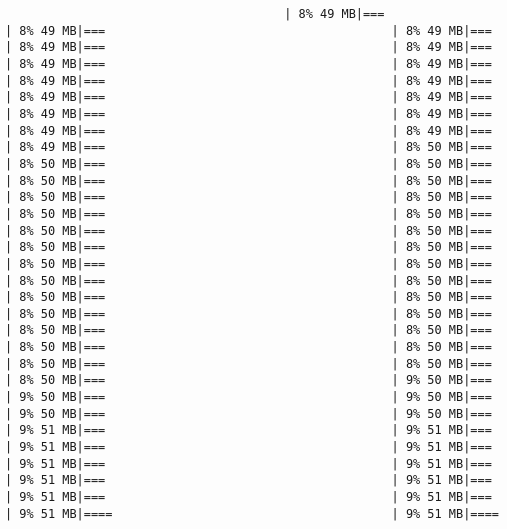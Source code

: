 \documentclass[
]{article}
\begin{document}
\begin{verbatim}
                                       | 8% 49 MB|===                                        | 8% 49 MB|===                                        | 8% 49 MB|===                                        | 8% 49 MB|===                                        | 8% 49 MB|===                                        | 8% 49 MB|===                                        | 8% 49 MB|===                                        | 8% 49 MB|===                                        | 8% 49 MB|===                                        | 8% 49 MB|===                                        | 8% 49 MB|===                                        | 8% 49 MB|===                                        | 8% 49 MB|===                                        | 8% 49 MB|===                                        | 8% 49 MB|===                                        | 8% 49 MB|===                                        | 8% 50 MB|===                                        | 8% 50 MB|===                                        | 8% 50 MB|===                                        | 8% 50 MB|===                                        | 8% 50 MB|===                                        | 8% 50 MB|===                                        | 8% 50 MB|===                                        | 8% 50 MB|===                                        | 8% 50 MB|===                                        | 8% 50 MB|===                                        | 8% 50 MB|===                                        | 8% 50 MB|===                                        | 8% 50 MB|===                                        | 8% 50 MB|===                                        | 8% 50 MB|===                                        | 8% 50 MB|===                                        | 8% 50 MB|===                                        | 8% 50 MB|===                                        | 8% 50 MB|===                                        | 8% 50 MB|===                                        | 8% 50 MB|===                                        | 8% 50 MB|===                                        | 8% 50 MB|===                                        | 8% 50 MB|===                                        | 8% 50 MB|===                                        | 8% 50 MB|===                                        | 8% 50 MB|===                                        | 8% 50 MB|===                                        | 9% 50 MB|===                                        | 9% 50 MB|===                                        | 9% 50 MB|===                                        | 9% 50 MB|===                                        | 9% 50 MB|===                                        | 9% 51 MB|===                                        | 9% 51 MB|===                                        | 9% 51 MB|===                                        | 9% 51 MB|===                                        | 9% 51 MB|===                                        | 9% 51 MB|===                                        | 9% 51 MB|===                                        | 9% 51 MB|===                                        | 9% 51 MB|===                                        | 9% 51 MB|===                                        | 9% 51 MB|====                                       | 9% 51 MB|====                         
\end{verbatim}
\end{document}
